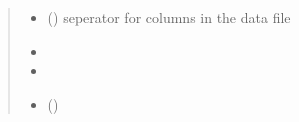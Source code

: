 \documentclass[letterpaper,10pt,english]{sphinxmanual}
\begin{document}
\begin{fulllineitems}
\begin{quote}
\begin{description}
\begin{itemize}
\item {} 
 (\sphinxstyleliteralemphasis{\sphinxupquote{, }}) \textendash{} seperator for columns in the data file

\item {} 
 \textendash{} 

\item {} 
\sphinxstyleliteralstrong{\sphinxupquote{-{-}-{-}-{-}-{-}}} \textendash{} 

\item {} 
 () \textendash{} 

\end{itemize}

\end{description}\end{quote}

\end{fulllineitems}

\end{document}

